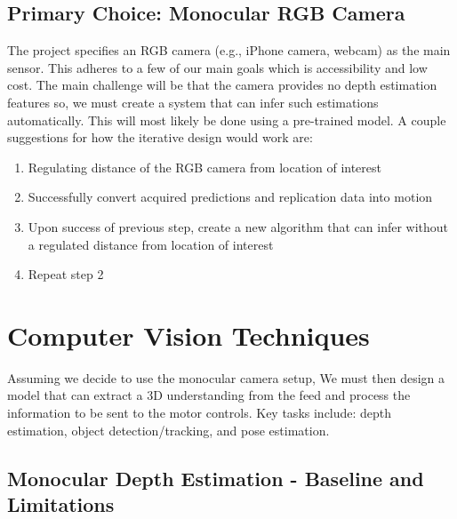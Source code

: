 \documentclass[document]{llncs}
\begin{document}



\subsection{Primary Choice: Monocular RGB Camera}
The project specifies an RGB camera (e.g., iPhone camera, webcam) as the main sensor. This adheres to a few of our main goals which is accessibility and low cost. The main challenge will be that the camera provides no depth estimation features so, we must create a system that can infer such estimations automatically. This will most likely be done using a pre-trained model. A couple suggestions for how the iterative design would work are:
\begin{enumerate}
    \item Regulating distance of the RGB camera from location of interest 
    \item Successfully convert acquired predictions and replication data into motion
    \item Upon success of previous step, create a new algorithm that can infer without a regulated distance from location of interest
    \item Repeat step 2
\end{enumerate}
\section{Computer Vision Techniques}
Assuming we decide to use the monocular camera setup, We must then design a model that can extract a 3D understanding from the feed and process the information to be sent to the motor controls. Key tasks include: depth estimation, object detection/tracking, and pose estimation.

\subsection{Monocular Depth Estimation - Baseline and Limitations}
\end{document}
